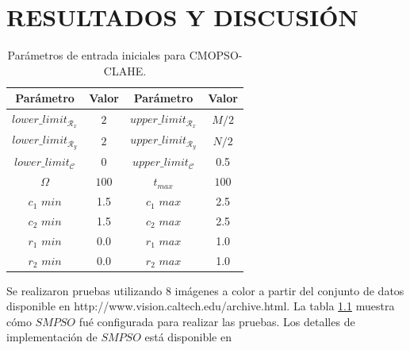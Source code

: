 \chapter{RESULTADOS Y DISCUSIÓN}
\label{sec:results_discussion}
\begin{table}[H]
\setlength{\abovecaptionskip}{2pt plus 3pt minus 2pt} %
\caption[Parámetros de entrada para $MOPSO$]{Parámetros de entrada iniciales para CMOPSO-CLAHE.}
\begin{center}
 \begin{tabular}{||c c | c c||} 
 \hline
 Parámetro & Valor & Parámetro & Valor \\ [0.5ex] 
 \hline\hline
 $lower\_limit_{\mathscr{R}_x}$ & $2$ & $upper\_limit_{\mathscr{R}_x}$ & $M/2$ \\ 
 \hline
 $lower\_limit_{\mathscr{R}_y}$ & $2$ & $upper\_limit_{\mathscr{R}_y}$ & $N/2$ \\  
 \hline
 $lower\_limit_{{\mathscr{C}}}$ & $0$ & $upper\_limit_{{\mathscr{C}}}$ & 0.5 \\
\hline
$\Omega$ & $100$ & $t_{max}$ & $100$ \\ 
\hline
$c_1$ $min$ & 1.5 & $c_1$ $max$ & 2.5 \\ 
\hline
$c_2$ $min$ & 1.5 & $c_2$ $max$ & 2.5 \\ 
\hline
$r_1$ $min$ & 0.0 & $r_1$ $max$ & 1.0 \\ 
\hline
$r_2$ $min$ & 0.0 & $r_2$ $max$ & 1.0 \\
\hline
\end{tabular}
\end{center}
\label{table:parametrospso}
\end{table}

Se realizaron pruebas utilizando 8 imágenes a color a partir del conjunto de datos disponible en http://www.vision.caltech.edu/archive.html. La tabla \ref{table:parametrospso} muestra cómo $SMPSO$ fué configurada para realizar las pruebas. Los detalles de implementación de $SMPSO$ está disponible en \cite{durillo2010jmetal}

